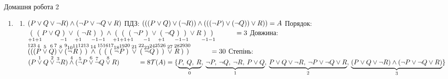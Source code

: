 \documentclass[a4paper,12pt]{article}
\newcommand\tab[1][1cm]{\hspace*{#1}}
\begin{document}
\begin{center}
{\LARGE Домашня робота 2}	
\end{center}
\begin{enumerate}
	\item \begin{enumerate} 
	\item $(P\lor Q\lor \neg R)\land(\neg P\lor \neg Q\lor R)\\$ ПДЗ: $(((P\lor Q)\lor(\neg R))\land(((\neg P)\lor(\neg Q))\lor R))=A\\$ Порядок: $\underset{+1}{(}\underset{+1}{(}P\lor Q\underset{-1}{)}\lor\underset{+1}{(}\neg R\underset{-1}{)}\underset{-1}{)}\land\underset{+1}{(}\underset{+1}{(}\underset{+1}{(}\neg P\underset{-1}{)}\lor\underset{+1}{(}\neg Q\underset{-1}{)}\underset{-1}{)}\lor R\underset{-1}{)}\underset{-1}{)}\tab =3\\$ Довжина: $\overset{1}(\overset{2}(\overset{3}(\overset{4}P\overset{5}\lor \overset{6}Q\overset{7})\overset{8}\lor\overset{9}(\overset{10}\neg \overset{11}R\overset{12})\overset{13})\overset{14}\land\overset{15}(\overset{16}(\overset{17}(\overset{18}\neg \overset{19}P\overset{20})\overset{21}\lor\overset{22}(\overset{23}\neg \overset{24}Q\overset{25})\overset{26})\overset{27}\lor \overset{28}R\overset{29})\overset{30})\tab =30\\$ Степінь: $(P\overset{1}\lor Q\overset{2}\lor \overset{3}\neg R)\overset{4}\land(\overset{5}\neg P\overset{6}\lor \overset{7}\neg Q\overset{8}\lor R)\tab =8\\ \mathcal{T}(A)=\{\underbrace{P,\>Q,\>R}_0,\>\underbrace{\neg P,\>\neg Q,\>\neg R,\>P\lor Q}_1,\>\underbrace{P\lor Q\lor\neg R,\>\neg P\lor \neg Q\lor R}_2,\\\underbrace{(P\lor Q\lor \neg R)\land(\neg P\lor \neg Q\lor R)}_3\}$

\end{enumerate}
\end{enumerate}
\end{document}
